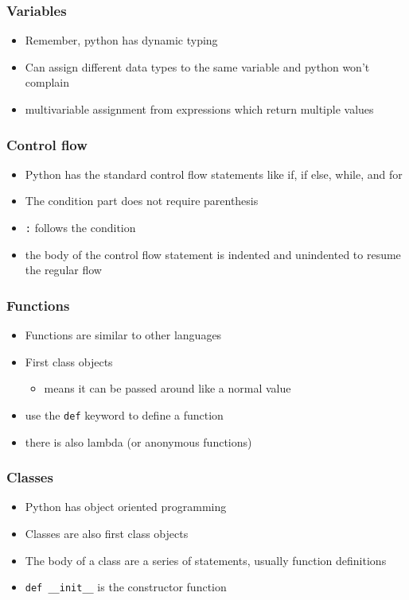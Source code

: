 \documentclass{beamer}
\begin{document}
\begin{frame}
  \frametitle{Variables}
  \begin{itemize}
    \item Remember, python has dynamic typing
    \item Can assign different data types to the same variable and python won't complain
    \item multivariable assignment from expressions which return multiple values
  \end{itemize}
  \centerline{}
\end{frame}
\begin{frame}
  \frametitle{Control flow}
  \begin{itemize}
    \item Python has the standard control flow statements like if, if else, while, and for
    \item The condition part does not require parenthesis
    \item \texttt{:} follows the condition
    \item the body of the control flow statement is indented and unindented to resume the regular flow
  \end{itemize}
  \centerline{}
\end{frame}
\begin{frame}
  \frametitle{Functions}
  \begin{itemize}
    \item Functions are similar to other languages
    \item First class objects
      \begin{itemize}
        \item means it can be passed around like a normal value
      \end{itemize}
    \item use the \texttt{def} keyword to define a function
    \item there is also lambda (or anonymous functions)
  \end{itemize}
  \centerline{}
\end{frame}
\begin{frame}
  \frametitle{Classes}
  \begin{itemize}
    \item Python has object oriented programming
    \item Classes are also first class objects
    \item The body of a class are a series of statements, usually function definitions
    \item \texttt{def \_\_init\_\_} is the constructor function
  \end{itemize}
  \centerline{}
\end{frame}
\end{document}
